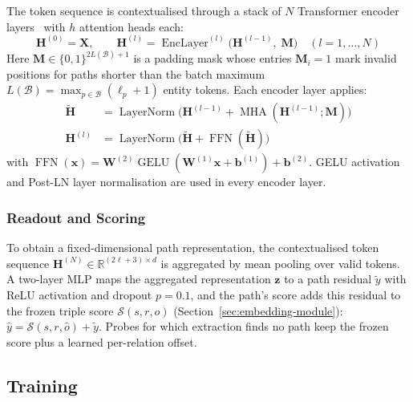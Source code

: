 \documentclass[runningheads]{llncs}
\begin{document}
The token sequence is contextualised through a stack of $N$
Transformer encoder layers~\cite{vaswani2017attention} with $h$ attention heads each:
\begin{equation}
  \mathbf{H}^{(0)} = \mathbf{X},\qquad
  \mathbf{H}^{(l)} = \operatorname{EncLayer}^{(l)}\bigl(\mathbf{H}^{(l-1)},\; \mathbf{M}\bigr)
  \quad (l = 1, \ldots, N)
  \label{eq:transformer}
\end{equation}
Here $\mathbf{M} \in \{0, 1\}^{2L(\mathcal{B})+1}$ is a padding mask
whose entries $\mathbf{M}_i = 1$ mark invalid positions for paths
shorter than the batch maximum $L(\mathcal{B}) = \max_{p \in \mathcal{B}}
(\ell_p + 1)$ entity tokens.
Each encoder layer applies:
\begin{align}
  \tilde{\mathbf{H}} &= \operatorname{LayerNorm}\bigl(
  \mathbf{H}^{(l-1)} + \operatorname{MHA}(\mathbf{H}^{(l-1)}; \mathbf{M})\bigr)
  \label{eq:attn}\\
  \mathbf{H}^{(l)} &= \operatorname{LayerNorm}\bigl(
  \tilde{\mathbf{H}} + \operatorname{FFN}(\tilde{\mathbf{H}})\bigr)
  \label{eq:ffn}
\end{align}
with $\operatorname{FFN}(\mathbf{x}) = \mathbf{W}^{(2)} \operatorname{GELU}(\mathbf{W}^{(1)} \mathbf{x} + \mathbf{b}^{(1)}) + \mathbf{b}^{(2)}$.
GELU \cite{hendrycks2016gaussian} activation
and Post-LN layer normalisation are used in every encoder layer.

\subsubsection{Readout and Scoring}

\label{sec:readout}

To obtain a fixed-dimensional path representation, the contextualised
token sequence $\mathbf{H}^{(N)} \in \mathbb{R}^{(2\ell+3) \times d}$ is
aggregated by mean pooling over valid tokens. A two-layer MLP maps the
aggregated representation $\mathbf{z}$ to a path residual $\tilde{y}$
with ReLU activation and dropout $p = 0.1$, and the path's score adds
this residual to the frozen triple score $\mathcal{S}(s, r, \hat{o})$
(Section~\ref{sec:embedding-module}):
$\hat{y} = \mathcal{S}(s, r, \hat{o}) + \tilde{y}$.
Probes for which extraction finds no path keep the frozen score plus a
learned per-relation offset.

\subsection{Training}
\end{document}
